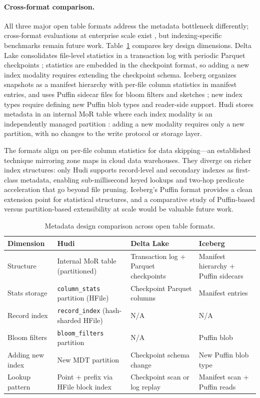 \documentclass[sigconf]{acmart}
\begin{document}
\paragraph{Cross-format comparison.}
All three major open table formats address the metadata bottleneck differently; cross-format evaluations at enterprise scale exist \cite{walmart-blog}, but indexing-specific benchmarks remain future work.
Table~\ref{tab:comparison} compares key design dimensions.
Delta Lake consolidates file-level statistics in a transaction log with periodic Parquet checkpoints \cite{armbrust2020deltalake}; statistics are embedded in the checkpoint format, so adding a new index modality requires extending the checkpoint schema.
Iceberg organizes snapshots as a manifest hierarchy with per-file column statistics in manifest entries, and uses Puffin sidecar files for bloom filters and sketches \cite{iceberg-spec}; new index types require defining new Puffin blob types and reader-side support.
Hudi stores metadata in an internal MoR table where each index modality is an independently managed partition \cite{hudi-metadata,hudi-indexes}: adding a new modality requires only a new partition, with no changes to the write protocol or storage layer.

The formats align on per-file column statistics for data skipping---an established technique mirroring zone maps in cloud data warehouses.
They diverge on richer index structures: only Hudi supports record-level and secondary indexes as first-class metadata, enabling sub-millisecond keyed lookups and two-hop predicate acceleration that go beyond file pruning.
Iceberg's Puffin format provides a clean extension point for statistical structures, and a comparative study of Puffin-based versus partition-based extensibility at scale would be valuable future work.

\begin{table}[t]
\caption{Metadata design comparison across open table formats.}
\label{tab:comparison}
\centering
\scriptsize
\begin{tabular}{@{}p{1.6cm}p{2.0cm}p{1.9cm}p{1.8cm}@{}}
\toprule
\textbf{Dimension} & \textbf{Hudi} & \textbf{Delta Lake} & \textbf{Iceberg} \\
\midrule
Structure & Internal MoR table (partitioned) & Transaction log + Parquet checkpoints & Manifest hierarchy + Puffin sidecars \\
\addlinespace
Stats storage & \texttt{column\_stats} partition (HFile) & Checkpoint Parquet columns & Manifest entries \\
\addlinespace
Record index & \texttt{record\_index} (hash-sharded HFile) & N/A & N/A \\
\addlinespace
Bloom filters & \texttt{bloom\_filters} partition & N/A & Puffin blob \\
\addlinespace
Adding new index & New MDT partition & Checkpoint schema change & New Puffin blob type \\
\addlinespace
Lookup pattern & Point + prefix via HFile block index & Checkpoint scan or log replay & Manifest scan + Puffin reads \\
\bottomrule
\end{tabular}
\end{table}
\end{document}
